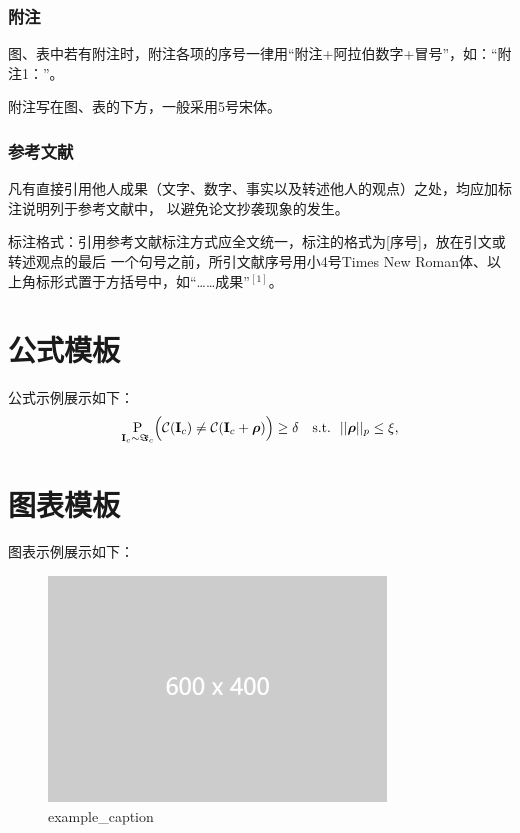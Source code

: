 \documentclass[zihao=-4]{ctexart}
\begin{document}
\begin{spacing}{1.5}
\subsubsection{附注}
图、表中若有附注时，附注各项的序号一律用“附注+阿拉伯数字+冒号”，如：“附注1：”。

附注写在图、表的下方，一般采用5号宋体。

\subsubsection{参考文献}
凡有直接引用他人成果（文字、数字、事实以及转述他人的观点）之处，均应加标注说明列于参考文献中，
以避免论文抄袭现象的发生。

标注格式：引用参考文献标注方式应全文统一，标注的格式为[序号]，放在引文或转述观点的最后
一个句号之前，所引文献序号用小4号Times New Roman体、以上角标形式置于方括号中，如“……成果”$^{[1]}$。

\section{公式模板}

公式示例展示如下：
\begin{align}
\underset{{\bf I}_c \sim \boldsymbol\Im_c}{\mathrm{\text P}} \Big( \mathcal C({\bf I}_c) \neq \mathcal C({\bf I}_c + \boldsymbol \rho) \Big) \geq \delta ~~~\text{s.t.}~~||\boldsymbol\rho||_p \leq \xi,
\label{eq:def1}
\end{align}

\section{图表模板}
图表示例展示如下：

\begin{figure}[H] %
    \centering %
    \includegraphics[width=0.8\textwidth]{example-image-2.png} %
    \caption{example\_caption} %
    \label{example_label} %
\end{figure}


\end{spacing}
\end{document}
